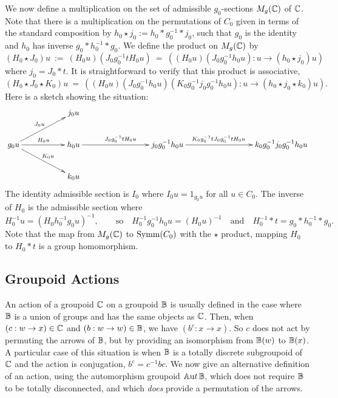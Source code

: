 \medskip
We now define a multiplication on the set of admissible $g_0$-sections 
$M_g(\mathbb{C})$ of $\mathbb{C}$. 
Note that there is a multiplication on the permutations of $C_0$ 
given in terms of the standard composition by 
$h_0 \star j_0 := h_0 * g_0^{-1} * j_0$, 
such that $g_0$ is the identity and $h_0$ has inverse $g_0*h_0^{-1}*g_0$. 
We define the product on $M_g(\mathbb{C})$ by 
$$
(H_0 \star J_0)u ~:=~ (H_0 u)(J_0 g_0^{-1} t H_0 u) 
                  ~=~ ((H_0 u)(J_0 g_0^{-1} h_0 u) : u \to (h_0 \star j_0)u)  
$$
where $j_0=J_0*t$. 
It is straightforward to verify that this product is associative, 
$$
(H_0 \star J_0 \star K_0)u 
  ~=~  ((H_0 u)(J_0 g_0^{-1} h_0 u)(K_0 g_0^{-1} j_0 g_0^{-1} h_0 u) 
          : u \to (h_0 \star j_0 \star k_0)u). 
$$
Here is a sketch showing the situation: 
$$
\xymatrix{
  &&  j_0 u 
      &&& &&&   \\
g_0 u  \ar[rr]^{H_0 u} \ar[urr]^{J_0 u} \ar[drr]^{K_0 u} 
  &&  h_0u  \ar[rrr]^{J_0 g_0^{-1} t H_0 u} 
      &&&  j_0 g_0^{-1} h_0 u 
              \ar[rrr]^(0.45){K_0 g_0^{-1} t J_0 g_0^{-1} t H_0 u}
          &&&  k_0 g_0^{-1} j_0 g_0^{-1} h_0 u  \\
  &&  k_0 u 
      &&&  &&&  
}$$
The identity admissible section is $I_0$ 
where $I_0u = 1_{g_0 u}$ for all $u \in C_0$. 
The inverse of $H_0$ is the admissible section where 
$$
H_0^{-1} u = (H_0 h_0^{-1} g_0 u)^{-1}, 
\qquad\text{so}\quad 
H_0^{-1} g_0^{-1} h_0 u = (H_0 u)^{-1} 
\quad\text{and}\quad 
H_0^{-1}*t = g_0 * h_0^{-1} * g_0. 
$$
Note that the map from $M_g(\mathbb{C})$ to $\mathrm{Symm}(C_0)$ with the $\star$ product, 
mapping $H_0$ to $H_0*t$ is a group homomorphism.




\newpage
\subsection{Groupoid Actions}  \label{subsect:gpd-act}

An action of a groupoid $\mathbb{C}$ on a groupoid $\mathbb{B}$ 
is usually defined in the case where $\mathbb{B}$ is a union of groups 
and has the same objects as $\mathbb{C}$. 
Then, when $(c : w \to x) \in \mathbb{C}$ and $(b : w \to w) \in \mathbb{B}$, 
we have $(b^c : x \to x)$. 
So $c$ does not act by permuting the arrows of $\mathbb{B}$, 
but by providing an isomorphism from $\mathbb{B}(w)$ to $\mathbb{B}(x)$. 
A particular case of this situation is when $\mathbb{B}$ is a totally 
discrete subgroupoid of $\mathbb{C}$ and the action is conjugation, 
$b^c = c^{-1}bc$. 
We now give an alternative definition of an action, 
using the automorphism groupoid $\mathbb{A}{\mathrm ut}\,\mathbb{B}$, 
which does not require $\mathbb{B}$ to be totally disconnected, 
and which \emph{does} provide a permutation of the arrows. 


